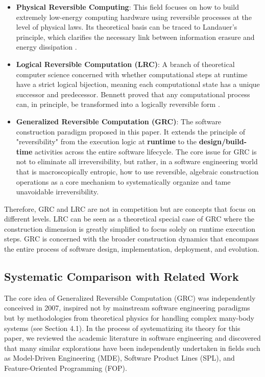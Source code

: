 \documentclass[11pt]{article}
\begin{document}
\begin{itemize}
    \item \textbf{Physical Reversible Computing}: This field focuses on how to build extremely low-energy computing hardware using reversible processes at the level of physical laws. Its theoretical basis can be traced to Landauer's principle, which clarifies the necessary link between information erasure and energy dissipation \cite{landauer1961}.
    \item \textbf{Logical Reversible Computation (LRC)}: A branch of theoretical computer science concerned with whether computational steps at runtime have a strict logical bijection, meaning each computational state has a unique successor and predecessor. Bennett proved that any computational process can, in principle, be transformed into a logically reversible form \cite{bennett1973}.
    \item \textbf{Generalized Reversible Computation (GRC)}: The software construction paradigm proposed in this paper. It extends the principle of "reversibility" from the execution logic at \textbf{runtime} to the \textbf{design/build-time} activities across the entire software lifecycle. The core issue for GRC is not to eliminate all irreversibility, but rather, in a software engineering world that is macroscopically entropic, how to use reversible, algebraic construction operations as a core mechanism to systematically organize and tame unavoidable irreversibility.
\end{itemize}

Therefore, GRC and LRC are not in competition but are concepts that focus on different levels. LRC can be seen as a theoretical special case of GRC where the construction dimension is greatly simplified to focus solely on runtime execution steps. GRC is concerned with the broader construction dynamics that encompass the entire process of software design, implementation, deployment, and evolution.

\subsection{Systematic Comparison with Related Work}

The core idea of Generalized Reversible Computation (GRC) was independently conceived in 2007, inspired not by mainstream software engineering paradigms but by methodologies from theoretical physics for handling complex many-body systems (see Section 4.1). In the process of systematizing its theory for this paper, we reviewed the academic literature in software engineering and discovered that many similar explorations have been independently undertaken in fields such as Model-Driven Engineering (MDE), Software Product Lines (SPL), and Feature-Oriented Programming (FOP).
\end{document}
